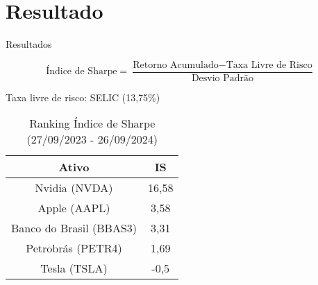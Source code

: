 \documentclass[aspectratio=169]{beamer}
\begin{document}
\section{Resultado}

\begin{frame}{Resultados}

\begin{center}
\[
\text{Índice de Sharpe} = \frac{\text{Retorno Acumulado} - \text{Taxa Livre de Risco}}{\text{Desvio Padrão}}
\]
\end{center}

\vspace{0.5em}

\begin{center}
Taxa livre de risco: SELIC (13,75\%)
\end{center}


\begin{table}[h]
    \centering
    \large
    \begin{tabular}{|c|c|} %
        \hline %
        Ativo  & IS \\ %
        \hline %
        Nvidia (NVDA)   & 16,58   \\ %
        \hline %
        Apple (AAPL)   & 3,58   \\ %
        \hline %
        Banco do Brasil (BBAS3)  & 3,31   \\ %
        \hline %
        Petrobrás (PETR4)  & 1,69   \\ %
        \hline %
        Tesla (TSLA)   & -0,5  \\ %
        \hline %
    \end{tabular}
    \caption{Ranking Índice de Sharpe (27/09/2023 - 26/09/2024)}
    \label{tab:ranking_sharpe}
\end{table}
\end{frame}
\end{document}
